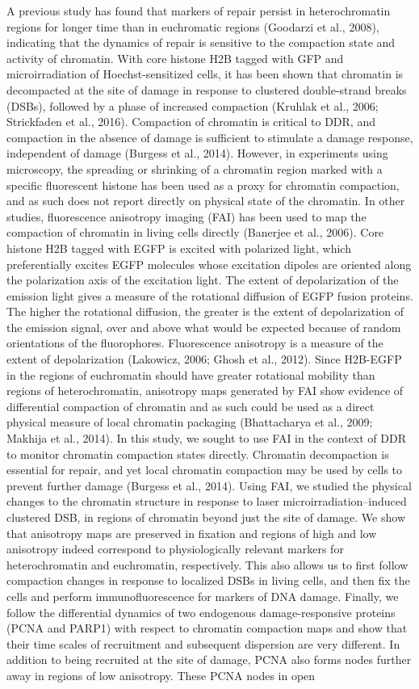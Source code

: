 A previous study has found that markers of repair persist in heterochromatin regions for longer time than in euchromatic regions (Goodarzi et al., 2008), indicating that the dynamics of repair is sensitive to the compaction state and activity of chromatin. With core histone H2B tagged with GFP and microirradiation of Hoechst-sensitized cells, it has been shown that chromatin is decompacted at the site of damage in response to clustered double-strand breaks (DSBs), followed by a phase of increased compaction (Kruhlak et al., 2006; Strickfaden et al., 2016). Compaction of chromatin is critical to DDR, and compaction in the absence of damage is sufficient to stimulate a damage response, independent of damage (Burgess et al., 2014). However, in experiments using microscopy, the spreading or shrinking of a chromatin region marked with a specific fluorescent histone has been used as a proxy for chromatin compaction, and as such does not report directly on physical state of the chromatin. In other studies, fluorescence anisotropy imaging (FAI) has been used to map the compaction of chromatin in living cells directly (Banerjee et al., 2006). Core histone H2B tagged with EGFP is excited with polarized light, which preferentially excites EGFP molecules whose excitation dipoles are oriented along the polarization axis of the excitation light. The extent of depolarization of the emission light gives a measure of the rotational diffusion of EGFP fusion proteins. The higher the rotational diffusion, the greater is the extent of depolarization of the emission signal, over and above what would be expected because of random orientations of the fluorophores. Fluorescence anisotropy is a measure of the extent of depolarization (Lakowicz, 2006; Ghosh et al., 2012). Since H2B-EGFP in the regions of euchromatin should have greater rotational mobility than regions of heterochromatin, anisotropy maps generated by FAI show evidence of differential compaction of chromatin and as such could be used as a direct physical measure of local chromatin packaging (Bhattacharya et al., 2009; Makhija et al., 2014). In this study, we sought to use FAI in the context of DDR to monitor chromatin compaction states directly. Chromatin decompaction is essential for repair, and yet local chromatin compaction may be used by cells to prevent further damage (Burgess et al., 2014). Using FAI, we studied the physical changes to the chromatin structure in response to laser microirradiation–induced clustered DSB, in regions of chromatin beyond just the site of damage. We show that anisotropy maps are preserved in fixation and regions of high and low anisotropy indeed correspond to physiologically relevant markers for heterochromatin and euchromatin, respectively. This also allows us to first follow compaction changes in response to localized DSBs in living cells, and then fix the cells and perform immunofluorescence for markers of DNA damage. Finally, we follow the differential dynamics of two endogenous damage-responsive proteins (PCNA and PARP1) with respect to chromatin compaction maps and show that their time scales of recruitment and subsequent dispersion are very different. In addition to being recruited at the site of damage, PCNA also forms nodes further away in regions of low anisotropy. These PCNA nodes in open 